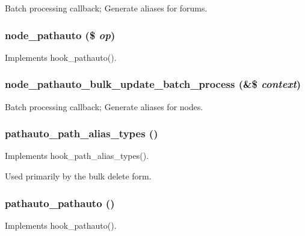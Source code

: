 \label{pathauto_8pathauto_8inc_a523c81c744995116b6a4fb7a3691bd54}
Batch processing callback; Generate aliases for forums. \hypertarget{pathauto_8pathauto_8inc_a2781dd6166a94526e682f5ace0e19635}{
\subsubsection[{node\_\-pathauto}]{\setlength{\rightskip}{0pt plus 5cm}node\_\-pathauto (\$ {\em op})}}
\label{pathauto_8pathauto_8inc_a2781dd6166a94526e682f5ace0e19635}
Implements hook\_\-pathauto(). \hypertarget{pathauto_8pathauto_8inc_a41b1fb468254bd8dfe65936a52d137f2}{
\subsubsection[{node\_\-pathauto\_\-bulk\_\-update\_\-batch\_\-process}]{\setlength{\rightskip}{0pt plus 5cm}node\_\-pathauto\_\-bulk\_\-update\_\-batch\_\-process (\&\$ {\em context})}}
\label{pathauto_8pathauto_8inc_a41b1fb468254bd8dfe65936a52d137f2}
Batch processing callback; Generate aliases for nodes. \hypertarget{pathauto_8pathauto_8inc_aec760cc2879a4d3c483ba9417a582a2e}{
\subsubsection[{pathauto\_\-path\_\-alias\_\-types}]{\setlength{\rightskip}{0pt plus 5cm}pathauto\_\-path\_\-alias\_\-types ()}}
\label{pathauto_8pathauto_8inc_aec760cc2879a4d3c483ba9417a582a2e}
Implements hook\_\-path\_\-alias\_\-types().

Used primarily by the bulk delete form. \hypertarget{pathauto_8pathauto_8inc_a23d135d372c98c88372883e32e10d16a}{
\subsubsection[{pathauto\_\-pathauto}]{\setlength{\rightskip}{0pt plus 5cm}pathauto\_\-pathauto ()}}
\label{pathauto_8pathauto_8inc_a23d135d372c98c88372883e32e10d16a}
Implements hook\_\-pathauto().

